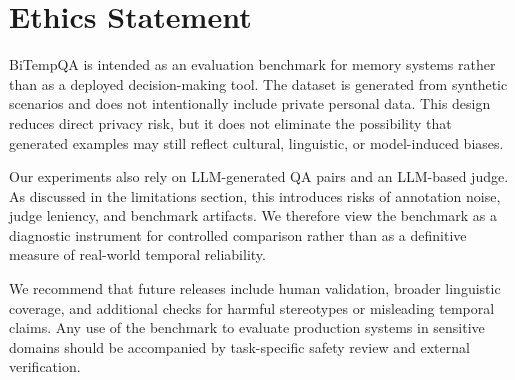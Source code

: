 \section{Ethics Statement}

BiTempQA is intended as an evaluation benchmark for memory systems rather than as a deployed decision-making tool. The dataset is generated from synthetic scenarios and does not intentionally include private personal data. This design reduces direct privacy risk, but it does not eliminate the possibility that generated examples may still reflect cultural, linguistic, or model-induced biases.

Our experiments also rely on LLM-generated QA pairs and an LLM-based judge. As discussed in the limitations section, this introduces risks of annotation noise, judge leniency, and benchmark artifacts. We therefore view the benchmark as a diagnostic instrument for controlled comparison rather than as a definitive measure of real-world temporal reliability.

We recommend that future releases include human validation, broader linguistic coverage, and additional checks for harmful stereotypes or misleading temporal claims. Any use of the benchmark to evaluate production systems in sensitive domains should be accompanied by task-specific safety review and external verification.
